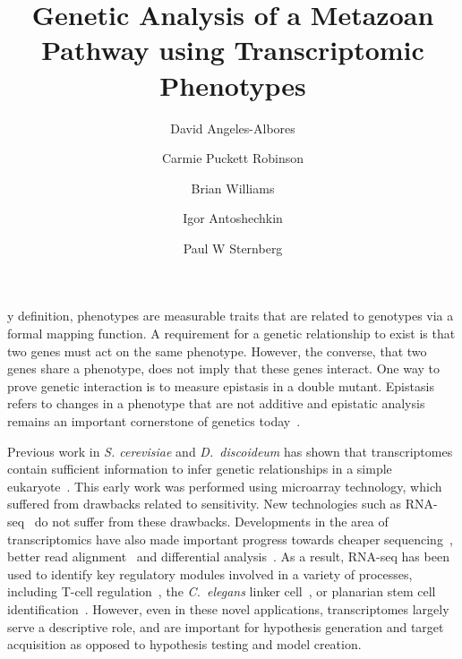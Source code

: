 \documentclass[9pt,twocolumn,twoside]{pnas-new}
\title{Genetic Analysis of a Metazoan Pathway using Transcriptomic Phenotypes}
\author[a,b, *]{David Angeles-Albores}
\author[a,b, *]{Carmie Puckett Robinson}
\author[a]{Brian Williams}
\author[a]{Igor Antoshechkin}
\author[a,b]{Paul W Sternberg}
\affil[a]{Department of Biology and Biological Engineering, Caltech, Pasadena, USA, 91125}
\affil[b]{Howard Hughes Medical Institute}
\affil[*]{These authors contributed equally to this manuscript}
\newcommand{\cel}{\emph{C.~elegans}}
\newcommand{\dicty}{\emph{D.~discoideum}}
\begin{document}
\verticaladjustment{-2pt}

\maketitle
\thispagestyle{firststyle}

y definition, phenotypes are measurable traits that are related to genotypes via a formal mapping function. A requirement for a genetic relationship to exist is that two genes must act on the same phenotype. However, the converse, that two genes share a phenotype, does not imply that these genes interact. One way to prove genetic interaction is to measure epistasis in a double mutant. Epistasis refers to changes in a phenotype that are not additive and epistatic analysis remains an important cornerstone of genetics today~\cite{Phillips2008}.

Previous work in \emph{S. cerevisiae} and \dicty{} has shown that transcriptomes contain sufficient information to infer genetic relationships in a simple eukaryote~\cite{Hughes2000, VanDriessche2005}. This early work was performed using microarray technology, which suffered from drawbacks related to sensitivity. New technologies such as RNA-seq~\cite{Mortazavi2008} do not suffer from these drawbacks. Developments in the area of transcriptomics have also made important progress towards cheaper sequencing~\cite{Metzker2010}, better read alignment~\cite{Patro2014, Bray2015,Patro2015} and differential analysis~\cite{Pimentel2016,Trapnell2013}.
As a result, RNA-seq has been used to identify key regulatory modules involved in a variety of processes, including T-cell regulation~\cite{Singer2016,Shalek2013}, the \cel{} linker cell~\cite{Schwarz2012}, or planarian stem cell identification~\cite{VanWolfswinkel2014,Scimone2014}. However, even in these novel applications, transcriptomes largely serve a descriptive role, and are important for hypothesis generation and target acquisition as opposed to hypothesis testing and model creation.
\end{document}

